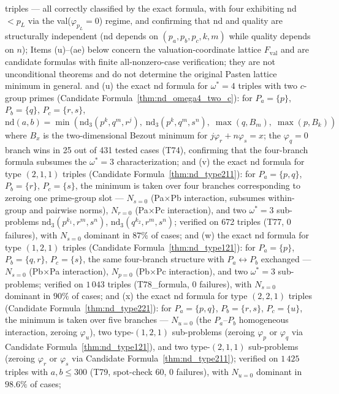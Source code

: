 \documentclass[12pt]{article}
\theoremstyle{definition}
\begin{document}
triples — all correctly classified by the exact formula, with four exhibiting
nd $< p_L$ via the val($\varphi_{p_L}=0$) regime, and confirming that nd and
quality are structurally independent (nd depends on $(p_a,p_b,p_c,k,m)$ while
quality depends on $n$);
Items (u)--(ae) below concern the valuation-coordinate lattice
$F_{\mathrm{val}}$ and are candidate formulas with finite all-nonzero-case
verification; they are not unconditional theorems and do not determine the
original Pasten lattice minimum in general.
and (u) the exact $\mathrm{nd}$ formula for $\omega^*=4$ triples with two $c$-group primes
(Candidate Formula~\ref{thm:nd_omega4_two_c}): for $P_a=\{p\}$, $P_b=\{q\}$, $P_c=\{r,s\}$,
$\mathrm{nd}(a,b) = \min(\mathrm{nd}_{3}(p^k,q^m,r^j),\; \mathrm{nd}_{3}(p^k,q^m,s^n),\;
\max(q,B_m),\; \max(p,B_k))$
where $B_x$ is the two-dimensional Bezout minimum for $j\varphi_r+n\varphi_s=x$;
the $\varphi_q=0$ branch wins in 25 out of 431 tested cases (T74), confirming that
the four-branch formula subsumes the $\omega^*=3$ characterization;
and (v) the exact $\mathrm{nd}$ formula for type $(2,1,1)$ triples
(Candidate Formula~\ref{thm:nd_type211}): for $P_a=\{p,q\}$, $P_b=\{r\}$, $P_c=\{s\}$,
the minimum is taken over four branches corresponding to zeroing one prime-group slot —
$N_{s=0}$ (Pa$\times$Pb interaction, subsumes within-group and pairwise norms),
$N_{r=0}$ (Pa$\times$Pc interaction),
and two $\omega^*=3$ sub-problems $\mathrm{nd}_3(p^{k_1},r^m,s^n)$,
$\mathrm{nd}_3(q^{k_2},r^m,s^n)$; verified on 672 triples (T77, $0$ failures),
with $N_{s=0}$ dominant in $87\%$ of cases;
and (w) the exact $\mathrm{nd}$ formula for type $(1,2,1)$ triples
(Candidate Formula~\ref{thm:nd_type121}): for $P_a=\{p\}$, $P_b=\{q,r\}$, $P_c=\{s\}$,
the same four-branch structure with $P_a \leftrightarrow P_b$ exchanged —
$N_{s=0}$ (Pb$\times$Pa interaction), $N_{p=0}$ (Pb$\times$Pc interaction),
and two $\omega^*=3$ sub-problems; verified on $1\,043$ triples (T78\_formula,
$0$ failures), with $N_{s=0}$ dominant in $90\%$ of cases;
and (x) the exact $\mathrm{nd}$ formula for type $(2,2,1)$ triples
(Candidate Formula~\ref{thm:nd_type221}): for $P_a=\{p,q\}$, $P_b=\{r,s\}$, $P_c=\{u\}$,
the minimum is taken over five branches — $N_{u=0}$ (the $P_a$--$P_b$ homogeneous
interaction, zeroing $\varphi_u$), two type-$(1,2,1)$ sub-problems (zeroing
$\varphi_p$ or $\varphi_q$ via Candidate Formula~\ref{thm:nd_type121}), and two
type-$(2,1,1)$ sub-problems (zeroing $\varphi_r$ or $\varphi_s$ via
Candidate Formula~\ref{thm:nd_type211}); verified on $1\,425$ triples with $a, b \le 300$
(T79, spot-check $60$, $0$ failures), with $N_{u=0}$ dominant in $98.6\%$ of cases;
\end{document}
